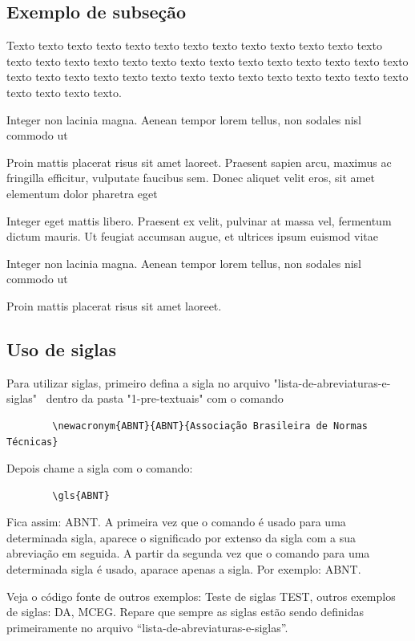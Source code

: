 \subsection{Exemplo de subseção} \label{sec:ex_sec}
	
    Texto texto texto texto texto texto texto texto texto texto texto texto texto texto texto texto texto texto texto texto texto texto texto texto texto texto texto texto texto texto texto texto texto texto texto texto texto texto texto texto texto texto texto texto texto.



    \begin{alineascomponto}
	    \item Integer non lacinia magna. Aenean tempor lorem tellus, non sodales nisl commodo ut
	    \item Proin mattis placerat risus sit amet laoreet. Praesent sapien arcu, maximus ac fringilla efficitur, vulputate faucibus sem. Donec aliquet velit eros, sit amet elementum dolor pharetra eget
	    \item Integer eget mattis libero. Praesent ex velit, pulvinar at massa vel, fermentum dictum mauris. Ut feugiat accumsan augue, et ultrices ipsum euismod vitae
	    \begin{subalineascomponto}
		    \item Integer non lacinia magna. Aenean tempor lorem tellus, non sodales nisl commodo ut
		    \item Proin mattis placerat risus sit amet laoreet.
	    \end{subalineascomponto}
    \end{alineascomponto}

\subsection{Uso de siglas} \label{sec:siglas}

    Para utilizar siglas, primeiro defina a sigla no arquivo "lista-de-abreviaturas-e-siglas"~ dentro da pasta "1-pre-textuais" com o comando 
    \begin{verbatim}
        \newacronym{ABNT}{ABNT}{Associação Brasileira de Normas Técnicas}
    \end{verbatim}
    Depois chame a sigla com o comando:
    \begin{verbatim}
        \gls{ABNT}
    \end{verbatim}
    Fica assim: \gls{ABNT}. A primeira vez que o comando é usado para uma determinada sigla, aparece o significado por extenso da sigla com a sua abreviação em seguida. A partir da segunda vez que o comando para uma determinada sigla é usado, aparace apenas a sigla. Por exemplo: \gls{ABNT}.  
    
    Veja o código fonte de outros exemplos: Teste de siglas \gls{TEST}, outros exemplos de siglas: \gls{DA}, \gls{MCEG}. 
    Repare que sempre as siglas estão sendo definidas primeiramente no arquivo ``lista-de-abreviaturas-e-siglas''.
\fi
